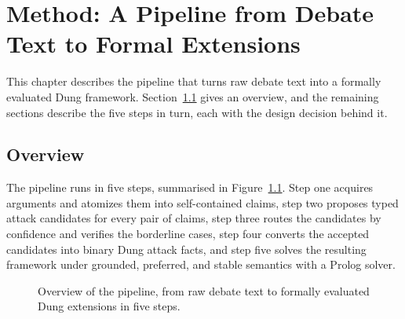 %
\chapter{Method: A Pipeline from Debate Text to Formal Extensions}
\label{sec:method}

This chapter describes the pipeline that turns raw debate text into a formally
evaluated Dung framework. Section~\ref{sec:method:overview} gives an overview,
and the remaining sections describe the five steps in turn, each with the design
decision behind it.

\section{Overview}
\label{sec:method:overview}

The pipeline runs in five steps, summarised in
Figure~\ref{fig:method:pipeline}. Step one acquires arguments and atomizes
them into self-contained claims, step two proposes typed attack candidates for
every pair of claims, step three routes the candidates by confidence and
verifies the borderline cases, step four converts the accepted candidates into
binary Dung attack facts, and step five solves the resulting framework under
grounded, preferred, and stable semantics with a Prolog solver.

\begin{figure}[t]
  \centering
  \caption{Overview of the pipeline, from raw debate text to formally evaluated
  Dung extensions in five steps.}
  \label{fig:method:pipeline}
\end{figure}

